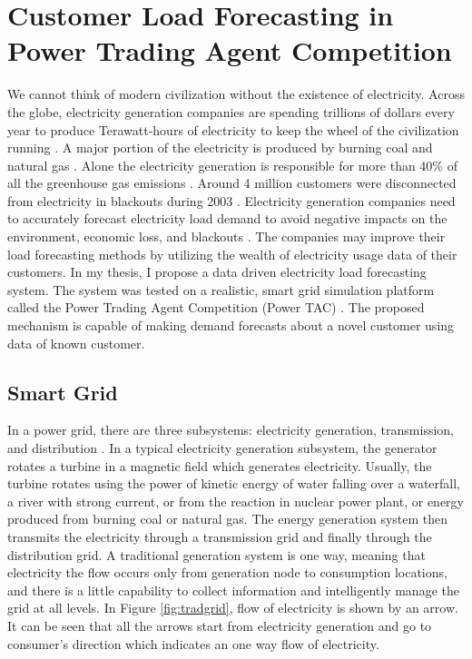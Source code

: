 
\chapter{Customer Load Forecasting in Power Trading Agent Competition}

We cannot think of modern civilization without the existence of electricity. Across the globe, electricity generation companies are spending trillions of dollars every year to produce Terawatt-hours of electricity to keep the wheel of the civilization running \cite{electricityStats}. A major portion of the electricity is produced by burning coal and natural gas \cite{electricityStats}. Alone the electricity generation is responsible for more than 40\% of all the greenhouse gas emissions \cite{schreiber2009environmental}. Around 4 million customers were disconnected from electricity in blackouts during 2003 \cite{andersson2005causes}. Electricity generation companies need to accurately forecast electricity load demand to avoid negative impacts on the environment, economic loss, and blackouts \cite{lodhi2013impact, sanghvi1982economic}. The companies may improve their load forecasting methods by utilizing the wealth of electricity usage data of their customers. In my thesis, I propose a data driven electricity load forecasting system. The system was tested on a realistic, smart grid \cite{fang2012smart} simulation platform called the Power Trading Agent Competition (Power TAC) \cite{ketter2013power}. The proposed mechanism is capable of making demand forecasts about a novel customer using data of known customer.

\section{Smart Grid}

In a power grid, there are three subsystems: electricity generation, transmission, and distribution \cite{fang2012smart}. In a typical electricity generation subsystem, the generator rotates a turbine in a magnetic field which generates electricity. Usually, the turbine rotates using the power of kinetic energy of water falling over a waterfall, a river with strong current, or from the reaction in nuclear power plant, or energy produced from burning coal or natural gas. The energy generation system then transmits the electricity through a transmission grid and finally through the distribution grid. A traditional generation system is one way, meaning that electricity the flow occurs only from generation node to consumption locations, and there is a little capability to collect information and intelligently manage the grid at all levels. In Figure \ref{fig:tradgrid}, flow of electricity is shown by an arrow. It can be seen that all the arrows start from electricity generation and go to consumer's direction which indicates an one way flow of electricity.

